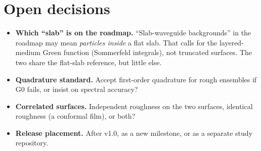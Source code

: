 \documentclass[11pt,a4paper]{article}
\begin{document}
\section{Open decisions}
\begin{itemize}
  \item \textbf{Which ``slab'' is on the roadmap.} ``Slab-waveguide backgrounds'' in the
        roadmap may mean \emph{particles inside} a flat slab. That calls for the
        layered-medium Green function (Sommerfeld integrals), not truncated surfaces.
        The two share the flat-slab reference, but little else.
  \item \textbf{Quadrature standard.} Accept first-order quadrature for rough
        ensembles if G0 fails, or insist on spectral accuracy?
  \item \textbf{Correlated surfaces.} Independent roughness on the two surfaces,
        identical roughness (a conformal film), or both?
  \item \textbf{Release placement.} After v1.0, as a new milestone, or as a separate study repository.
\end{itemize}
\end{document}
